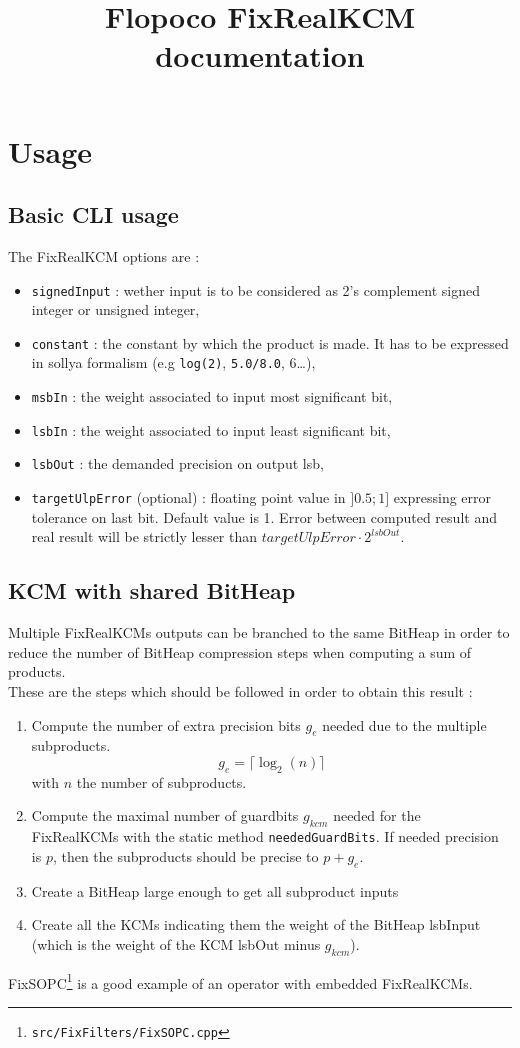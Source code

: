 \documentclass[10pt, a4paper, twocolumn]{article}
\title{Flopoco FixRealKCM documentation}
\begin{document}
\maketitle
\section{Usage}
\subsection{Basic CLI usage}
The FixRealKCM options are :
\begin{itemize}
\item \texttt{signedInput} : wether input is to be considered as 2's complement signed integer or unsigned integer,
\item \texttt{constant}  : the constant by which the product is made. It has to be expressed in sollya formalism  (e.g \texttt{log(2)}, \texttt{5.0/8.0}, 6\dots),
\item \texttt{msbIn} : the weight associated to input most significant bit,
\item \texttt{lsbIn} : the weight associated to input least significant bit,
\item \texttt{lsbOut} : the demanded precision on output lsb,
\item \texttt{targetUlpError} (optional) : floating point value in $]0.5 ; 1]$ expressing error tolerance on last bit. Default value is 1. Error between computed result and real result will be strictly lesser than $targetUlpError \cdot 2^{lsbOut}$.
\end{itemize}
\subsection{KCM with shared BitHeap}
Multiple FixRealKCMs outputs can be branched to the same BitHeap in order to reduce the number of BitHeap compression steps when computing a sum of products.\\

These are the steps which should be followed in order to obtain this result :
\begin{enumerate}
\item Compute the number of extra precision bits $g_e$ needed due to the multiple subproducts.
\[ g_e =  \lceil\log_2(n)\rceil\]
with $n$ the number of subproducts.
\item Compute the maximal number of guardbits $g_{kcm}$ needed for the FixRealKCMs with the static method \texttt{neededGuardBits}. If needed precision is $p$, then the subproducts should be precise to $p + g_e$.

\item Create a BitHeap large enough to get all subproduct inputs

\item Create all the KCMs indicating them the weight of the BitHeap lsbInput (which is the weight of the KCM lsbOut minus $g_{kcm}$).
\end{enumerate}
FixSOPC\footnote{\texttt{src/FixFilters/FixSOPC.cpp}} is a good example of an operator with embedded FixRealKCMs.
\end{document}
